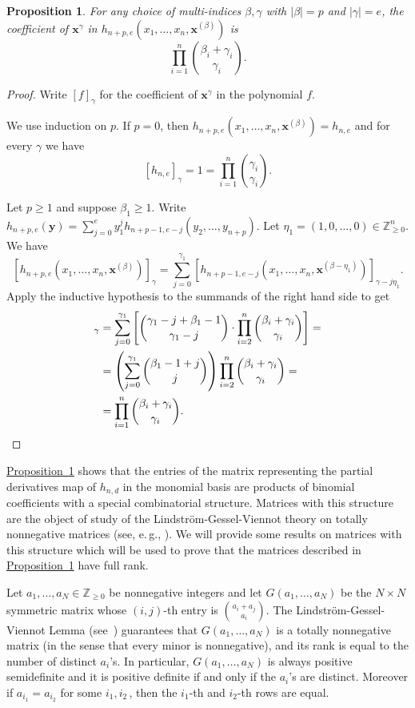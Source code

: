 \documentclass[11pt]{article}
\numberwithin{equation}{section}
\newtheorem{proposition}[theorem]{Proposition}
\theoremstyle{definition}
\theoremstyle{plain}
\newcommand{\eg}{e.\,g.}
\newcommand{\expref}[2]{\hyperref[#2]{#1~\ref{#2}}}
\newcommand{\vvirg}{ , \dots , }
\providecommand{\textprod}{}
\renewcommand{\textprod}{{\textstyle \prod}}
\newcommand{\bfx}{\mathbf{x}}
\newcommand{\bfy}{\mathbf{y}}
\newcommand{\bbZ}{\mathbb{Z}}
\begin{document}
\begin{proposition}\label{prop: coefficients of monomials is expanded h}
For any choice of multi-indices $\beta,\gamma$ with $\vert \beta \vert = p$ and $\vert \gamma \vert = e$, the coefficient of $\bfx^\gamma$ in $h_{n+p,e} ( x_1 \vvirg x_n, \bfx^{(\beta)})$ is 
\[
 \prod_{i=1}^n \binom{\beta_i + \gamma_i}{\gamma_i}.
\]
\end{proposition}
\begin{proof}
Write $[f]_{\gamma}$ for the coefficient of $\bfx^\gamma$ in the polynomial $f$.

We use induction on $p$. If $p = 0$, then $h_{n+p,e} ( x_1 \vvirg x_n, \bfx^{(\beta)}) = h_{n,e}$ and for every $\gamma$ we have
\[
  [h_{n,e}]_\gamma = 1 =  \textprod_{i=1}^n \binom{\gamma_i}{\gamma_i}.
\]

Let $p\geq 1$ and suppose $\beta_1 \geq 1$. Write $h_{n+p,e}(\bfy) = \sum_{j=0}^e y_1^{j} h_{n+p-1,e-j}(y_2 \vvirg y_{n+p})$. Let $\eta_1 = (1 ,0\vvirg 0) \in \bbZ^{n}_{\geq 0}$. We have
\[
 [h_{n+p,e}(x_1 \vvirg x_n,\bfx^{(\beta)})]_\gamma = \sum_{j=0}^{\gamma_1} [h_{n+p-1,e-j}(x_1 \vvirg x_n, \bfx^{(\beta-\eta_1)})]_{\gamma-j\eta_1}.
\]
Apply the inductive hypothesis to the summands of the right hand side  to get 
\begin{align*}
 [h_{n+p,e}(x_1 \vvirg x_n,\bfx^{(\beta)})]_\gamma &= \sum_{j=0}^{\gamma_1} \left[\binom{\gamma_1 - j + \beta_1 -1 }{\gamma_1 -j} \cdot \prod_{i=2}^n \binom{\beta_i + \gamma_i}{\gamma_i}\right]  = \\ 
 &= \left( \sum_{j=0}^{\gamma_1} \binom{\beta_1 -1 +j}{j}\right) \prod_{i=2}^n \binom{\beta_i + \gamma_i}{\gamma_i}  =\\
 &= \prod_{i=1}^n \binom{\beta_i + \gamma_i}{\gamma_i}.\qedhere
\end{align*}
\end{proof}

\expref{Proposition}{prop: coefficients of monomials is expanded h} shows that the entries of the matrix representing the partial derivatives map of $h_{n,d}$ in the monomial basis are products of binomial coefficients with a special combinatorial structure. Matrices with this structure are the object of study of the Lindstr\"om-Gessel-Viennot theory on totally nonnegative matrices (see, \eg, \cite{MR815360}). We will provide some results on matrices with this structure which will be used to prove that the matrices described in \expref{Proposition}{prop: coefficients of monomials is expanded h} have full rank.

Let $a_1 \vvirg a_N \in \bbZ_{\geq 0}$ be nonnegative integers and let $G(a_1 \vvirg a_N)$ be the $N \times N$ symmetric matrix whose $(i,j)$-th entry is $\binom{a_i+a_j}{a_i}$. The Lindstr\"om-Gessel-Viennot Lemma (see~\cite[\S2]{MR815360}) guarantees that $G(a_1 \vvirg a_N)$ is a totally nonnegative matrix (in the sense that every minor is nonnegative), and its rank is equal to the number of distinct $a_i$'s. In particular, $G(a_1 \vvirg a_N)$ is always positive semidefinite and it is positive definite if and only if the $a_i$'s are distinct. Moreover if $a_{i_1} = a_{i_2}$ for some $i_1,i_2$\,, then the $i_1$-th and $i_2$-th rows are equal. 
\end{document}
